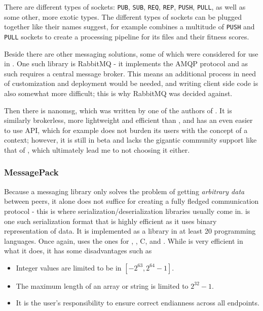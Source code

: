 There are different types of sockets: \texttt{PUB}, \texttt{SUB}, \texttt{REQ}, \texttt{REP}, \texttt{PUSH}, 
\texttt{PULL}, as well as some other, more exotic types. The different types of sockets can be plugged together
like their names suggest, for example \xmlmate combines a multitude of \texttt{PUSH} and \texttt{PULL} sockets
to create a processing pipeline for its \xml files and their fitness scores.

Beside \zmq there are other messaging solutions, some of which were considered for use in \xmlmate. One such
library is {\small RabbitMQ}\cite{rabbitmq} - it implements the AMQP protocol and as such requires a central
message broker. This means an additional process in need of customization and deployment would be needed, and
writing client side code is also somewhat more difficult; this is why {\small RabbitMQ} was decided against.

Then there is {\small nanomsg}\cite{nanomsg}, which was written by one of the authors of \zmq. 
It is similarly brokerless, more lightweight and efficient than \zmq, and has an even easier to use API, which
for example does not burden its users with the concept of a context; however, it is still in beta and lacks
the gigantic community support like that of \zmq, which ultimately lead me to not choosing it either.
\subsubsection{MessagePack}
Because a messaging library only solves the problem of getting \emph{arbitrary data} between peers, it 
alone does not suffice for creating a fully fledged communication protocol - this is where
serialization/deserialization libraries usually come in. \msgpack{}\cite{msgpack} is one such serialization
format that is highly efficient as it uses binary representation of data. It is implemented as a library in at
least 20 programming languages. Once again, \xmlmate uses the ones for \java, \python, {\small C}, and \cpp.
While \msgpack is very efficient in what it does, it has some disadvantages such as 
\begin{itemize}
  \item Integer values are limited to be in $[-2^{63}, 2^{64}-1]$.
  \item The maximum length of an array or string is limited to $2^{32}-1$.
  \item It is the user's responsibility to ensure correct endianness across all endpoints.
\end{itemize}

